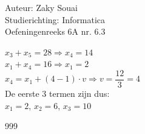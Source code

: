 \documentclass[a4paper]{article}
\begin{document}
  
\noindent \large Auteur: Zaky Souai \\
\noindent \large Studierichting:  Informatica\\
\noindent \large Oefeningenreeks 6A nr. 6.3\\

\bigskip

\normalsize

$x_3 + x_5 = 28 \Rightarrow x_{4} = 14$ \\

$x_1 + x_4 = 16 \Rightarrow x_{1} = 2$ \\

$x_{4} = x_{1} + (4-1) \cdot v \Rightarrow v = \dfrac{12}{3} = 4$ \\

De eerste 3 termen zijn dus:\\

$x_{1} = 2$, $x_{2} = 6$, $x_{3} = 10$ \\




\begin{thebibliography}{999}
\end{thebibliography}
\end{document}
